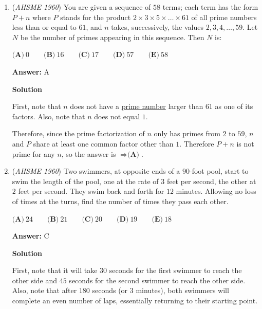 \begin{enumerate}
 For option C, substitution results in
 \[(2r)^2 = (r\sqrt{5} - r)2r\]
 \[4r^2 = 2r^2 \sqrt{5} - 2r^2\]

 For option D, substitution results in
 \[(r \sqrt{5} - r) \cdot 2r = r \cdot r\sqrt{5}\]
 \[2r^2 \sqrt{5} - 2r^2 = r^2 \sqrt{5}\]

 From each option, only option A has both sides equaling each other, so the answer is $\boxed{\textbf{(A)}}$.

 


	\item (\textit{AHSME 1960}) You are given a sequence of $58$ terms; each term has the form $P+n$ where $P$ stands for the product $2 \times 3 \times 5 \times\ldots \times 61$
of all prime numbers less than or equal to $61$, and $n$ takes, successively, the values $2, 3, 4,\ldots, 59$. 
Let $N$ be the number of primes appearing in this sequence. Then $N$ is:


 $\textbf{(A)}\ 0\qquad \textbf{(B)}\ 16\qquad \textbf{(C)}\ 17\qquad \textbf{(D)}\ 57\qquad \textbf{(E)}\ 58$

 \textbf{Answer: }A



\textbf{Solution}

First, note that $n$ does not have a \href{https://artofproblemsolving.com/wiki/index.php?title=Prime\_number}{prime number} larger than $61$ as one of its factors.  Also, note that $n$ does not equal $1$.

 Therefore, since the prime factorization of $n$ only has primes from $2$ to $59$, $n$ and $P$ share at least one common factor other than $1$.  Therefore $P+n$ is not prime for any $n$, so the answer is $\Rightarrow{\boxed{\textbf{(A)}}}$.

 


	\item (\textit{AHSME 1960}) Two swimmers, at opposite ends of a $90$-foot pool, start to swim the length of the pool, 
one at the rate of $3$ feet per second, the other at $2$ feet per second. 
They swim back and forth for $12$ minutes. Allowing no loss of times at the turns, find the number of times they pass each other. 


 $\textbf{(A)}\ 24\qquad \textbf{(B)}\ 21\qquad \textbf{(C)}\ 20\qquad \textbf{(D)}\ 19\qquad \textbf{(E)}\ 18$

 \textbf{Answer: }C



\textbf{Solution}

First, note that it will take $30$ seconds for the first swimmer to reach the other side and $45$ seconds for the second swimmer to reach the other side.  Also, note that after $180$ seconds (or $3$ minutes), both swimmers will complete an even number of laps, essentially returning to their starting point.


\end{enumerate}
